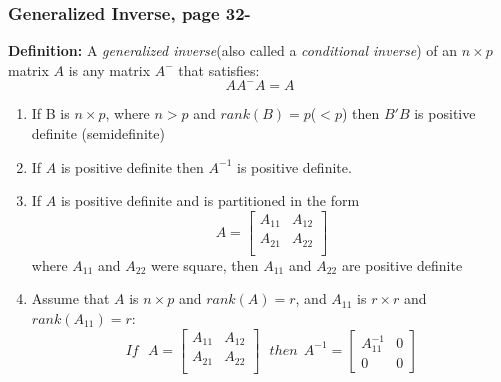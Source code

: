 \documentclass[]{article}
\begin{document}
\subsubsection{Generalized Inverse, page 32-}
\textbf{Definition:} A \emph{generalized inverse}(also called a \emph{conditional inverse}) of an $n\times p$ matrix $A$ is any matrix $A^-$ that satisfies:
\begin{equation}
	AA^-A = A
	\end{equation}
\begin{enumerate}[1)]
\item If B is $n\times p$, where $n>p$ and $rank(B)=p$($<p$) then $B'B$ is positive definite (semidefinite)
\item If $A$ is positive definite then $A^{-1}$ is positive definite.
\item If $A$ is positive definite and is partitioned in the form
\[ A =
\begin{bmatrix}
    A_{11}       & A_{12}  \\
    A_{21}       & A_{22} \\
\end{bmatrix}
\]
where $A_{11}$ and $A_{22}$ were square, then $A_{11}$ and $A_{22}$ are positive definite

\item Assume that $A$ is $n\times p$ and $rank(A) = r$, and $A_{11}$ is $r\times r$ and $rank(A_{11}) = r$:
 \[ If ~~~A =
\begin{bmatrix}
    A_{11}       & A_{12}  \\
    A_{21}       & A_{22} \\
\end{bmatrix}
~~~ then~~A^{-1} =
\begin{bmatrix}
    A_{11}^{-1}  &  0 \\
    0       &             0
\end{bmatrix}
\]

\end{enumerate}

\end{document}
